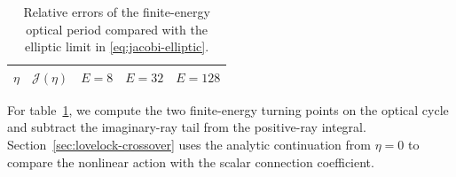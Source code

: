 \begin{table}[t]
 \centering\small
 \begin{tabular}{ccccc}
 \hline
 \(\eta\) & \(\mathcal J(\eta)\) & \(E=8\) & \(E=32\) & \(E=128\) \\
 \hline
 
 \end{tabular}
 \caption{Relative errors of the finite-energy optical period
 compared with the elliptic limit in \eqref{eq:jacobi-elliptic}.}
 \label{tab:geodesic-momentum}
\end{table}

For table~\ref{tab:geodesic-momentum}, we compute the two
finite-energy turning points on the optical cycle and subtract
the imaginary-ray tail from the positive-ray integral.
Section~\ref{sec:lovelock-crossover} uses the analytic continuation
from \(\eta=0\) to compare the nonlinear action with the scalar
connection coefficient.
